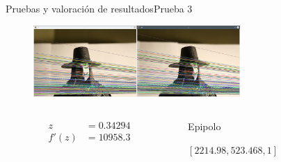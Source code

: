 \documentclass[14pt,spanish]{beamer}
\begin{document}
      \begin{frame}{Pruebas y valoración de resultados}{Prueba 3}

        \begin{overlayarea}{\textwidth}{8cm}
             {\begin{figure}[ht!]
              \centering
              \includegraphics[width=0.7\textwidth]{../Informe/V-Normal.png}
            \end{figure}

            \begin{columns}
              \begin{column}{0.2\textwidth}
                \begin{align*}
                  z &= 0.34294 \\
                  f'(z) &= 10958.3
                \end{align*}
              \end{column}
              \begin{column}{0.8\textwidth}
                Epipolo

                $[2214.98, 523.468, 1]$
              \end{column}
            \end{columns}


            }
\end{overlayarea}
\end{frame}
\end{document}
